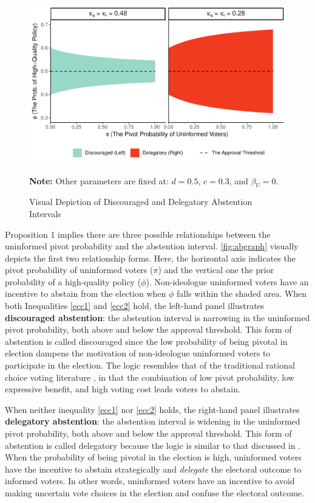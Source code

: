 \documentclass[letterpaper, 12pt]{article}
\newcommand{\floatnote}[1]{\vspace{\abovecaptionskip}\caption*{\textbf{Note:} #1}\vspace{-\abovecaptionskip}}
\begin{document}
    \begin{figure}[t!]
        \caption{Visual Depiction of Discouraged and Delegatory Abstention Intervals}
        \label{fig:abgraph}
        \includegraphics[width=\linewidth]{figure/abgraph-1}
        \floatnote{Other parameters are fixed at: $d=0.5$, $c=0.3$, and $\beta_U=0$.}
    \end{figure}
    
    \noindent Proposition 1 implies there are three possible relationships between the uninformed pivot probability and the abstention interval. \autoref{fig:abgraph} visually depicts the first two relationship forms. Here, the horizontal axis indicates the pivot probability of uninformed voters ($\pi$) and the vertical one the prior probability of a high-quality policy ($\phi$). Non-ideologue uninformed voters have an incentive to abstain from the election when $\phi$ falls within the shaded area. When both Inequalities \ref{ecc1} and \ref{ecc2} hold, the left-hand panel illustrates \textbf{discouraged abstention}: the abstention interval is narrowing in the uninformed pivot probability, both above and below the approval threshold. This form of abstention is called discouraged since the low probability of being pivotal in election dampens the motivation of non-ideologue uninformed voters to participate in the election. The logic resembles that of the traditional rational choice voting literature \citep{Downs1957anec, Riker1968thof, Matsusaka1995exvo}, in that the combination of low pivot probability, low expressive benefit, and high voting cost leads voters to abstain.
    
    \par When neither inequality \ref{ecc1} nor \ref{ecc2} holds, the right-hand panel illustrates \textbf{delegatory abstention}: the abstention interval is widening in the uninformed pivot probability, both above and below the approval threshold. This form of abstention is called delegatory because the logic is similar to that discussed in \cite{Feddersen1996thsw, Feddersen1999abin}. When the probability of being pivotal in the election is high, uninformed voters have the incentive to abstain strategically and \textit{delegate} the electoral outcome to informed voters. In other words, uninformed voters have an incentive to avoid making uncertain vote choices in the election and confuse the electoral outcome.
    
\end{document}
